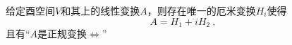 \begin{theorem}{}
给定酉空间$V$和其上的线性变换$A$，则存在唯一的厄米变换$H_i$使得
\begin{equation}
A=H_1+iH_2~,
\end{equation}
且有“$A$是正规变换$\Longleftrightarrow $”
\end{theorem}

